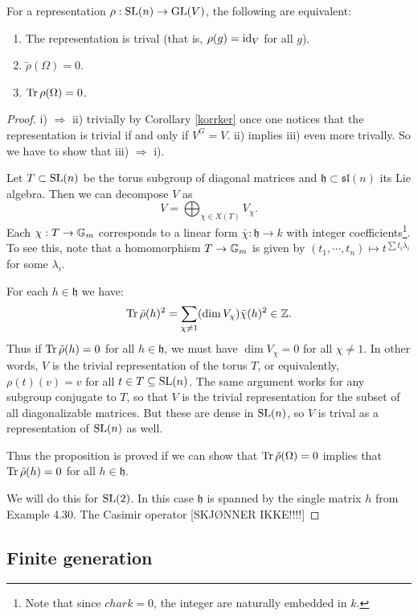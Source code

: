 \documentclass[11pt, english]{article}
\begin{document}
\begin{prop}
  For a representation $\rho: \operatorname{SL}(n) \to \operatorname{GL}(V)$, the following are equivalent:
  \begin{enumerate}
  \item The representation is trival (that is, $\rho(g)=\text{id}_V$ for all $g$).
\item $\tilde \rho (\Omega)=0$.
\item $\operatorname{Tr} \rho(\Omega) = 0$.
  \end{enumerate}
\end{prop}
\begin{proof}
i) $\Rightarrow$ ii) trivially by Corollary \ref{korrker} once one notices that the representation is trivial if and only if $V^G=V$. ii) implies iii) even more trivally. So we have to show that iii) $\Rightarrow$ i).

Let $T \subset \operatorname{SL}(n)$ be the torus subgroup of diagonal matrices and $\mathfrak h \subset \mathfrak{sl}(n)$ its Lie algebra. Then we can decompose $V$ as
$$
V = \bigoplus_{\chi \in X(T)} V_\chi.
$$
Each $\chi:T \to \mathbb{G}_m$ corresponds to a linear form $\bar \chi: \mathfrak h \to k$ with integer coefficients\footnote{Note that since $char k=0$, the integer are naturally embedded in $k$.}. To see this, note that a homomorphism $T \to \mathbb{G}_m$ is given by $(t_1,\cdots,t_n) \mapsto t^{\sum t_i\lambda_i}$ for some $\lambda_i$.

For each $ h \in \mathfrak h$ we have:
\[
\operatorname{Tr} \tilde \rho (h)^2 = \sum_{\chi \neq 1} (\dim V_\chi) \bar \chi(h)^2 \in \mathbb{Z}.
\]
Thus if $\operatorname{Tr} \tilde \rho (h)=0$ for all $h \in \mathfrak h$, we must have $\dim V_\chi=0$ for all $\chi \neq 1$. In other words, $V$ is the trivial representation of the torus $T$, or equivalently, $\rho(t)(v)=v$ for all $t \in T \subseteq \operatorname{SL}(n)$.  The same argument works for any subgroup conjugate to $T$, so that $V$ is the trivial representation for the subset of all diagonalizable matrices. But these are dense in $\operatorname{SL}(n)$, so $V$ is trival as a representation of $\operatorname{SL}(n)$ as well.

Thus the proposition is proved if we can show that $\operatorname{Tr} \tilde \rho (\Omega)=0$ implies that $\operatorname{Tr} \tilde \rho(h)=0$ for all $h \in \mathfrak h$.

We will do this for $\operatorname{SL}(2)$. In this case $\mathfrak h$ is spanned by the single matrix $h$ from Example 4.30. The Casimir operator [SKJØNNER IKKE!!!!]
\end{proof}



\subsection{Finite generation}
\end{document}
